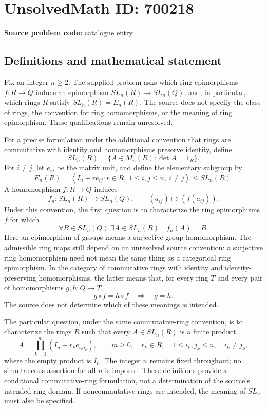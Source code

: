 \documentclass[11pt]{article}
\begin{document}
\section*{UnsolvedMath ID: 700218}
\textbf{Source problem code:} catalogue entry
\subsection{Definitions and mathematical statement}
Fix an integer \(n\geq 2\). The supplied problem asks which ring epimorphisms \(f:R\to Q\) induce an epimorphism \(SL_n(R)\to SL_n(Q)\), and, in particular, which rings \(R\) satisfy \(SL_n(R)=E_n(R)\). The source does not specify the class of rings, the convention for ring homomorphisms, or the meaning of ring epimorphism. These qualifications remain unresolved.

For a precise formulation under the additional convention that rings are commutative with identity and homomorphisms preserve identity, define
\[
SL_n(R)=\{A\in M_n(R):\det A=1_R\}.
\]
For \(i\ne j\), let \(e_{ij}\) be the matrix unit, and define the elementary subgroup by
\[
E_n(R)=\left\langle I_n+r e_{ij}:r\in R,\ 1\leq i,j\leq n,\ i\ne j\right\rangle\leq SL_n(R).
\]
A homomorphism \(f:R\to Q\) induces
\[
f_n:SL_n(R)\longrightarrow SL_n(Q),\qquad
(a_{ij})\longmapsto(f(a_{ij})).
\]
Under this convention, the first question is to characterize the ring epimorphisms \(f\) for which
\[
\forall B\in SL_n(Q)\ \exists A\in SL_n(R)\quad f_n(A)=B.
\]
Here an epimorphism of groups means a surjective group homomorphism. The admissible ring maps still depend on an unresolved source convention: a surjective ring homomorphism need not mean the same thing as a categorical ring epimorphism. In the category of commutative rings with identity and identity-preserving homomorphisms, the latter means that, for every ring \(T\) and every pair of homomorphisms \(g,h:Q\to T\),
\[
g\circ f=h\circ f\quad\Longrightarrow\quad g=h.
\]
The source does not determine which of these meanings is intended.

The particular question, under the same commutative-ring convention, is to characterize the rings \(R\) such that every \(A\in SL_n(R)\) is a finite product
\[
A=\prod_{k=1}^{m}(I_n+r_k e_{i_kj_k}),
\qquad m\geq0,\quad r_k\in R,\quad 1\leq i_k,j_k\leq n,\quad i_k\ne j_k,
\]
where the empty product is \(I_n\). The integer \(n\) remains fixed throughout; no simultaneous assertion for all \(n\) is imposed. These definitions provide a conditional commutative-ring formulation, not a determination of the source's intended ring domain. If noncommutative rings are intended, the meaning of \(SL_n\) must also be specified.
\end{document}
